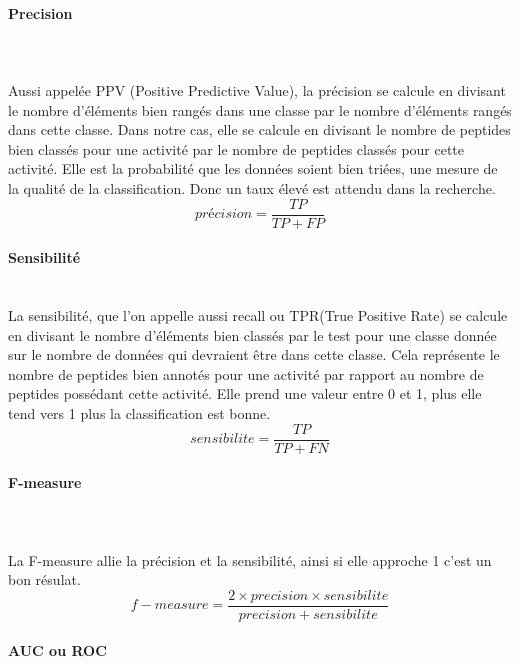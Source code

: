 \documentclass[a4paper,10pt]{report}
\begin{document}
	     \paragraph{Precision}\\
	      
	     ~\\ 
	     Aussi appelée PPV (Positive Predictive Value), la précision se calcule en divisant le nombre d'éléments bien rangés dans une classe par le nombre d'éléments rangés dans cette classe.
	     Dans notre cas, elle se calcule en divisant le nombre de peptides bien classés pour une activité par le nombre de peptides classés pour cette activité.
	     Elle est la probabilité que les données soient bien triées, une mesure de la qualité de la classification. 
	     Donc un taux élevé est attendu dans la recherche.
	     \[ 
	      précision = \frac{ TP }{ TP + FP }
	     \]

	     
	     \paragraph{Sensibilité}
	     
	     ~\\
	     La sensibilité, que l'on appelle aussi recall ou TPR(True Positive Rate) se calcule en divisant le nombre d'éléments bien classés par le test pour une classe donnée sur le nombre de données qui devraient être dans cette classe. 
	     Cela représente le nombre de peptides bien annotés pour une activité par rapport au nombre de peptides possédant cette activité.
	     Elle prend une valeur entre 0 et 1, plus elle tend vers 1 plus la classification est bonne.
	     \[
	      sensibilite = \frac{ TP }{ TP + FN }
	     \]

	     \paragraph{F-measure}\\
	     
	     ~\\La F-measure allie la précision et la sensibilité, ainsi si elle approche 1 c'est un bon résulat.
	     \[
	      f-measure = \frac{ 2 \times precision \times sensibilite }{ precision + sensibilite }
	     \]
	     \paragraph{AUC ou ROC}\\
		
\end{document}
